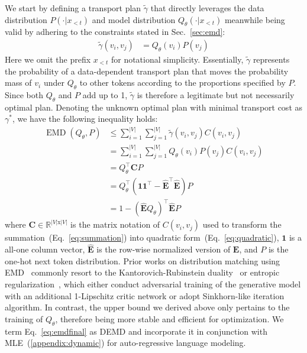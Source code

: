 We start by defining a transport plan $\tilde{\gamma}$ that directly leverages the data distribution $P(\cdot|x_{<t})$ and model distribution $Q_{\theta}(\cdot|x_{<t})$ meanwhile being valid by adhering to the constraints stated in Sec.~\ref{sec:emd}:
\begin{align}
    \tilde{\gamma}(v_i, v_j)&=Q_{\theta}(v_i)P(v_j)
    \label{eq:plan}
\end{align}
Here we omit the prefix $x_{<t}$ for notational simplicity. Essentially, $\tilde{\gamma}$ represents the probability of a data-dependent transport plan that moves the probability mass of $v_i$ under $Q_{\theta}$ to other tokens according to the proportions specified by $P$. Since both $Q_{\theta}$ and $P$ add up to 1, $\tilde{\gamma}$ is therefore a legitimate but not necessarily optimal plan. Denoting the unknown optimal plan with minimal transport cost as $\gamma^{*}$, we have the following inequality holds:
\begin{align}
    \nonumber
    \operatorname{EMD}(Q_{\theta}, P)&\leq\sum_{i=1}^{|V|}\sum_{j=1}^{|V|}\tilde{\gamma}(v_i, v_j)C(v_i, v_j) \\
    &=\sum_{i=1}^{|V|}\sum_{j=1}^{|V|}Q_{\theta}(v_i)P(v_j)C(v_i, v_j) \label{eq:summation} \\
    &=Q_{\theta}^{\top}\bm{C}P \label{eq:quadratic} \\
    \nonumber
    &=Q_{\theta}^{\top}(\bm{1}\bm{1}^{\top}-\bm{\hat{E}}^{\top}\bm{\hat{E}})P \\
    &=1-(\bm{\hat{E}}Q_{\theta})^{\top}\bm{\hat{E}}P
    \label{eq:emdfinal}
\end{align}
where $\bm{C}\in \mathbb{R}^{|V|\text{x}|V|}$ is the matrix notation of $C(v_i,v_j)$ used to transform the summation~(Eq.~\ref{eq:summation}) into quadratic form~(Eq.~\ref{eq:quadratic}), $\bm{1}$ is a all-one column vector, $\bm{\hat{E}}$ is the row-wise normalized version of $\bm{E}$, and $P$ is the one-hot next token distribution. Prior works on distribution matching using EMD~\cite{wgan,wgan_gp} commonly resort to the Kantorovich-Rubinstein duality~\citep{emd_duality} or entropic regularization~\citep{cuturi2013sinkhorn,emd2015}, which either conduct adversarial training of the generative model with an additional 1-Lipschitz critic network or adopt Sinkhorn-like iteration algorithm. In contrast, the upper bound we derived above only pertains to the training of $Q_{\theta}$, therefore being more stable and efficient for optimization. We term Eq.~\ref{eq:emdfinal} as DEMD and incorporate it in conjunction with MLE~(\ref{appendix:dynamic}) for auto-regressive language modeling.

